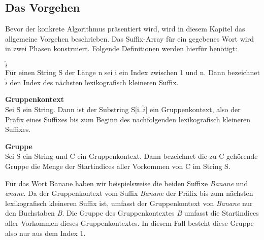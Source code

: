 \subsection{Das Vorgehen}
\label{gsaca:chapter2}
%
Bevor der konkrete Algorithmus präsentiert  wird, wird in diesem Kapitel das allgemeine Vorgehen beschrieben. 
Das Suffix-Array für ein gegebenes Wort wird in zwei Phasen konstruiert.
Folgende Definitionen werden hierfür benötigt:

\begin{definition}\textbf{$\widehat{i}$}\\
Für einen String S der Länge n sei i ein Index zwischen 1 und n. Dann bezeichnet $\widehat{i}$ den Index des nächsten lexikografisch kleineren Suffix.
\end{definition}

\begin{definition}\textbf{Gruppenkontext}\\
Sei S ein String. Dann ist der Substring S[i..$\widehat{i}$] ein Gruppenkontext, also der Präfix eines Suffixes bis zum Beginn des nachfolgenden lexikografisch kleineren Suffixes.
\end{definition}

\begin{definition}\textbf{Gruppe}\\
Sei S ein String und C ein Gruppenkontext. Dann bezeichnet die zu C gehörende Gruppe die Menge der Startindices aller Vorkommen von C im String S.
\end{definition}

Für das Wort Banane haben wir beispielsweise die beiden Suffixe \textit{Banane} und \textit{anane}.  
Da der Gruppenkontext vom Suffix \textit{Banane} der Präfix bis zum nächsten lexikografisch kleineren Suffix ist, umfasst der Gruppenkontext von \textit{Banane} nur den Buchstaben \textit{B}. 
Die Gruppe des Gruppenkontextes \textit{B} umfasst die Startindices aller Vorkommen dieses Gruppenkontextes.
In diesem Fall besteht diese Gruppe also nur aus dem Index 1.

